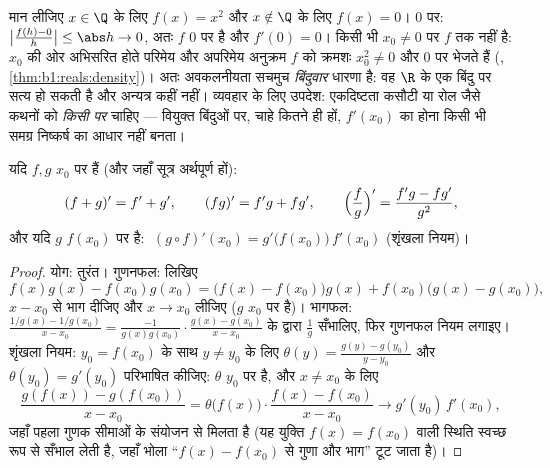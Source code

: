 \begin{example}[ठीक एक ही बिंदु पर अवकलनीय]\label{ex:b1:derivative:onepoint}
मान लीजिए $x \in \Q$ के लिए $f(x) = x^2$ और $x \notin \Q$ के लिए $f(x) = 0$।
$0$ पर: $\bigl|\frac{f(h) - 0}{h}\bigr| \leq \abs h \to 0$, अतः $f$ $0$ पर
 है और $f'(0) = 0$। किसी भी $x_0 \neq 0$ पर $f$  तक नहीं है:
$x_0$ की ओर अभिसरित होते परिमेय और अपरिमेय अनुक्रम $f$ को क्रमशः $x_0^2 \neq
0$ और $0$ पर भेजते हैं (, \cref{thm:b1:reals:density})। अतः अवकलनीयता
सचमुच \emph{बिंदुवार} धारणा है: वह $\R$ के एक बिंदु पर सत्य हो सकती है और
अन्यत्र कहीं नहीं। व्यवहार के लिए उपदेश: एकदिष्टता कसौटी या रोल जैसे कथनों
को  \emph{किसी  पर} चाहिए --- वियुक्त बिंदुओं पर, चाहे कितने ही
हों, $f'(x_0)$ का होना किसी भी समग्र निष्कर्ष का आधार नहीं बनता।
\end{example}

\begin{theorem}[संक्रियाएँ]\label{thm:b1:derivative:operations}
यदि $f, g$ $x_0$ पर  हैं (और जहाँ सूत्र अर्थपूर्ण हों):
\[
(f + g)' = f' + g', \qquad
(fg)' = f'g + fg', \qquad
\Bigl(\frac fg\Bigr)' = \frac{f'g - fg'}{g^2},
\]
और यदि $g$ $f(x_0)$ पर  है: $\;(g \circ f)'(x_0) =
g'\bigl(f(x_0)\bigr)\, f'(x_0)$ (शृंखला नियम)।
\end{theorem}

\begin{proof}
योग: तुरंत। गुणनफल: लिखिए
\[
f(x)g(x) - f(x_0)g(x_0)
= \bigl(f(x) - f(x_0)\bigr) g(x) + f(x_0)\bigl(g(x) - g(x_0)\bigr),
\]
$x - x_0$ से भाग दीजिए और $x \to x_0$ लीजिए ($g$ $x_0$ पर  है)। भागफल:
$\frac{1/g(x) - 1/g(x_0)}{x - x_0} = \frac{-1}{g(x)g(x_0)}\cdot\frac{g(x) -
g(x_0)}{x - x_0}$ के द्वारा $\frac 1g$ सँभालिए, फिर गुणनफल नियम लगाइए।
शृंखला नियम: $y_0 = f(x_0)$ के साथ $y \neq y_0$ के लिए $\theta(y) =
\frac{g(y) - g(y_0)}{y - y_0}$ और $\theta(y_0) = g'(y_0)$ परिभाषित कीजिए:
$\theta$ $y_0$ पर  है, और $x \neq x_0$ के लिए
\[
\frac{g(f(x)) - g(f(x_0))}{x - x_0}
= \theta\bigl(f(x)\bigr)\cdot \frac{f(x) - f(x_0)}{x - x_0}
\longrightarrow g'(y_0)\, f'(x_0),
\]
जहाँ पहला गुणक सीमाओं के संयोजन से मिलता है (यह युक्ति $f(x) = f(x_0)$ वाली
स्थिति स्वच्छ रूप से सँभाल लेती है, जहाँ भोला ``$f(x) - f(x_0)$ से गुणा और
भाग'' टूट जाता है)।
\end{proof}

